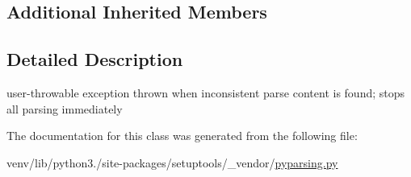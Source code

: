 \subsection*{Additional Inherited Members}


\subsection{Detailed Description}
\begin{DoxyVerb}user-throwable exception thrown when inconsistent parse content
   is found; stops all parsing immediately\end{DoxyVerb}
 

The documentation for this class was generated from the following file\+:\begin{DoxyCompactItemize}
\item 
venv/lib/python3./site-\/packages/setuptools/\+\_\+vendor/\hyperlink{setuptools_2__vendor_2pyparsing_8py}{pyparsing.\+py}\end{DoxyCompactItemize}
